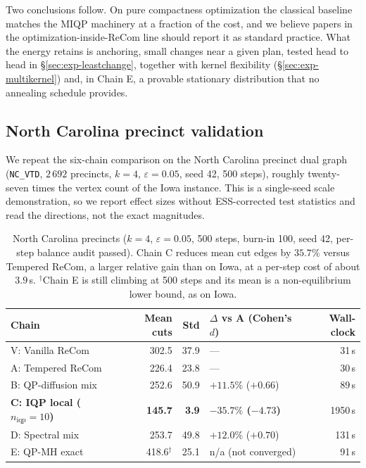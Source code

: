 \documentclass[11pt]{article}
\begin{document}
Two conclusions follow. On pure compactness optimization the classical
baseline matches the MIQP machinery at a fraction of the cost, and we
believe papers in the optimization-inside-ReCom line should report
it as standard practice. What the energy retains is anchoring, small
changes near a given plan, tested head to head in
\S\ref{sec:exp-leastchange}, together with kernel flexibility
(\S\ref{sec:exp-multikernel}) and, in Chain E, a provable stationary
distribution that no annealing schedule provides.

\subsection{North Carolina precinct validation}\label{sec:exp-nc}
We repeat the six-chain comparison on the North Carolina precinct dual
graph (\texttt{NC\_VTD}, $2\,692$ precincts, $k = 4$,
$\varepsilon = 0.05$, seed 42, 500 steps), roughly twenty-seven times
the vertex count of the Iowa instance. This is a single-seed scale
demonstration, so we report effect sizes without ESS-corrected test
statistics and read the directions, not the exact magnitudes.

\begin{table}[htbp]
\centering
\small
\begin{tabular}{lrrlr}
\toprule
Chain & Mean cuts & Std & $\Delta$ vs A (Cohen's $d$) & Wall-clock \\
\midrule
V: Vanilla ReCom    & 302.5 & 37.9 & ---                & 31\,s \\
A: Tempered ReCom   & 226.4 & 23.8 & ---                & 30\,s \\
B: QP-diffusion mix & 252.6 & 50.9 & $+11.5\%$ ($+0.66$) & 89\,s \\
\textbf{C: IQP local ($n_{\mathrm{iqp}} = 10$)}
                    & \textbf{145.7} & \textbf{3.9}
                    & \textbf{$-35.7\%$ ($-4.73$)} & 1950\,s \\
D: Spectral mix     & 253.7 & 49.8 & $+12.0\%$ ($+0.70$) & 131\,s \\
E: QP-MH exact      & 418.6$^{\dagger}$ & 25.1 & n/a (not converged) & 91\,s \\
\bottomrule
\end{tabular}
\caption{North Carolina precincts ($k = 4$, $\varepsilon = 0.05$,
  500 steps, burn-in 100, seed 42, per-step balance audit passed).
  Chain C reduces mean cut edges by $35.7\%$ versus Tempered ReCom,
  a larger relative gain than on Iowa, at a per-step cost of about
  $3.9$\,s. $^{\dagger}$Chain E is still climbing at 500 steps and its
  mean is a non-equilibrium lower bound, as on Iowa.}\label{tab:nc-headline}
\end{table}
\end{document}
